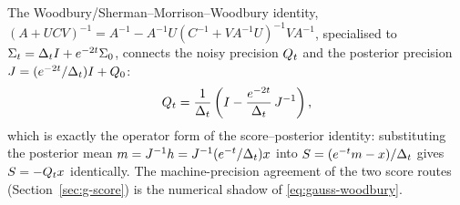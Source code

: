 The Woodbury/Sherman--Morrison--Woodbury identity,
$(A + UCV)^{-1} = A^{-1} - A^{-1}U (C^{-1} + V A^{-1} U)^{-1} V A^{-1}$,
specialised to $\Sigma_t = \Delta_t I + e^{-2t} \Sigma_0$, connects the noisy
precision $Q_t$ and the posterior precision
$J = (e^{-2t}/\Delta_t) I + Q_0$:
\begin{equation}
  Q_t
  = \frac{1}{\Delta_t}
    \left( I - \frac{e^{-2t}}{\Delta_t}\, J^{-1} \right),
  \label{eq:gauss-woodbury}
\end{equation}
which is exactly the operator form of the score--posterior identity: substituting the
posterior mean $m = J^{-1} h = J^{-1} (e^{-t}/\Delta_t) x$ into
$S = (e^{-t} m - x)/\Delta_t$ gives $S = -Q_t x$ identically. The
machine-precision agreement of the two score routes
(Section~\ref{sec:g-score}) is the numerical shadow of
\eqref{eq:gauss-woodbury}.
